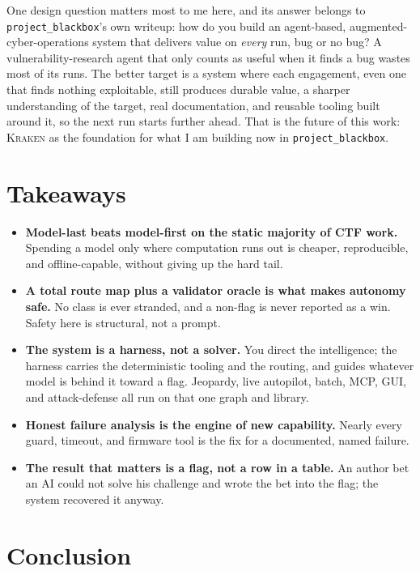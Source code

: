 \documentclass[10pt,twocolumn]{article}
\newcommand{\kraken}{\textsc{Kraken}}
\begin{document}
One design question matters most to me here, and its answer belongs to \texttt{project\_blackbox}'s own
writeup: how do you build an agent-based, augmented-cyber-operations system that delivers value on \emph{every}
run, bug or no bug? A vulnerability-research agent that only counts
as useful when it finds a bug wastes most of its runs. The better target is a system where each engagement,
even one that finds nothing exploitable, still produces durable value, a sharper understanding of the target,
real documentation, and reusable tooling built around it, so the next run starts further ahead. That is the
future of this work: \kraken{} as the foundation for what I am building now in \texttt{project\_blackbox}.

\section{Takeaways}

\begin{itemize}[leftmargin=1.1em,itemsep=2pt,topsep=2pt]
\item \textbf{Model-last beats model-first on the static majority of CTF work.} Spending a model only where
computation runs out is cheaper, reproducible, and offline-capable, without giving up the hard tail.
\item \textbf{A total route map plus a validator oracle is what makes autonomy safe.} No class is ever
stranded, and a non-flag is never reported as a win. Safety here is structural, not a prompt.
\item \textbf{The system is a harness, not a solver.} You direct the intelligence; the harness carries the
deterministic tooling and the routing, and guides whatever model is behind it toward a flag. Jeopardy, live
autopilot, batch, MCP, GUI, and attack-defense all run on that one graph and library.
\item \textbf{Honest failure analysis is the engine of new capability.} Nearly every guard, timeout, and
firmware tool is the fix for a documented, named failure.
\item \textbf{The result that matters is a flag, not a row in a table.} An author bet an AI could not solve his
challenge and wrote the bet into the flag; the system recovered it anyway.
\end{itemize}

\section{Conclusion}
\end{document}
